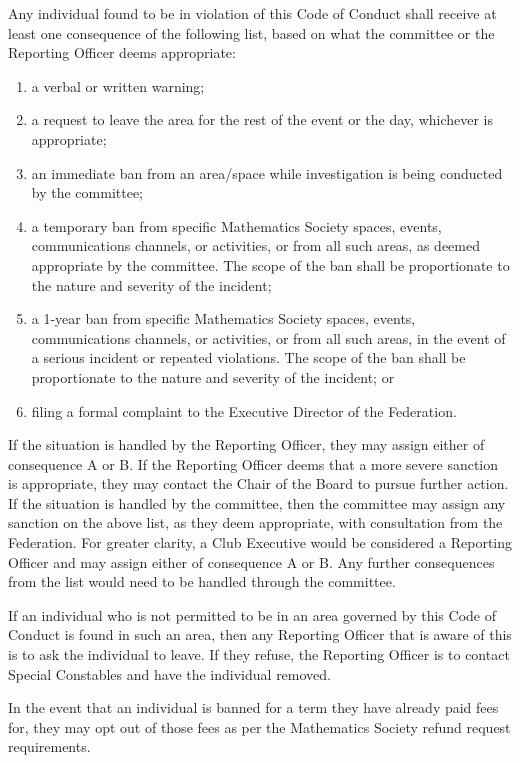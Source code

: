 Any individual found to be in violation of this Code of Conduct shall receive at least one consequence of the following list, based on what the committee or the Reporting Officer deems appropriate:
\begin{enumerate}[label=\Alph*.]
	\item a verbal or written warning;
	\item a request to leave the area for the rest of the event or the day, whichever is appropriate;
	\item an immediate ban from an area/space while investigation is being conducted by the committee;
	\item a temporary ban from specific Mathematics Society spaces, events, communications channels, or activities, or from all such areas, as deemed appropriate by the committee. The scope of the ban shall be proportionate to the nature and severity of the incident;
	\item a 1-year ban from specific Mathematics Society spaces, events, communications channels, or activities, or from all such areas, in the event of a serious incident or repeated violations. The scope of the ban shall be proportionate to the nature and severity of the incident; or
	\item filing a formal complaint to the Executive Director of the Federation.
\end{enumerate}
If the situation is handled by the Reporting Officer, they may assign either of consequence A or B. If the Reporting Officer deems that a more severe sanction is appropriate, they may contact the Chair of the Board to pursue further action. If the situation is handled by the committee, then the committee may assign any sanction on the above list, as they deem appropriate, with consultation from the Federation. For greater clarity, a Club Executive would be considered a Reporting Officer and may assign either of consequence A or B.  Any further consequences from the list would need to be handled through the committee.

If an individual who is not permitted to be in an area governed by this Code of Conduct is found in such an area, then any Reporting Officer that is aware of this is to ask the individual to leave. If they refuse, the Reporting Officer is to contact Special Constables and have the individual removed. 

In the event that an individual is banned for a term they have already paid fees for, they may opt out of those fees as per the Mathematics Society refund request requirements.


